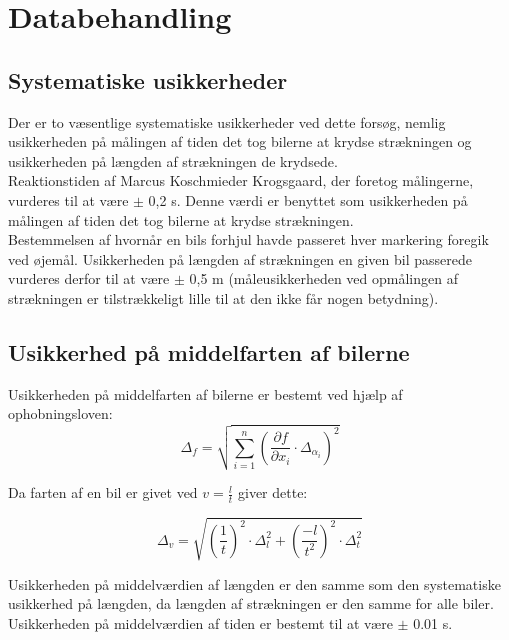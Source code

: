 \documentclass[hidelinks]{article}
\begin{document}
\newpage

\section{Databehandling}

\subsection{Systematiske usikkerheder}

Der er to væsentlige systematiske usikkerheder ved dette forsøg, nemlig usikkerheden på målingen af tiden det tog bilerne at krydse strækningen og usikkerheden på længden af strækningen de krydsede.\\

Reaktionstiden af Marcus Koschmieder Krogsgaard, der foretog målingerne, vurderes til at være $\pm$ 0,2 s. Denne værdi er benyttet som usikkerheden på målingen af tiden det tog bilerne at krydse strækningen.\\

Bestemmelsen af hvornår en bils forhjul havde passeret hver markering foregik ved øjemål. Usikkerheden på længden af strækningen en given bil passerede vurderes derfor til at være $\pm$ 0,5 m (måleusikkerheden ved opmålingen af strækningen er tilstrækkeligt lille til at den ikke får nogen betydning).\\

\subsection{Usikkerhed på middelfarten af bilerne} \label{usikkerhedmiddelfart}

Usikkerheden på middelfarten af bilerne er bestemt ved hjælp af ophobningsloven:\\

\[\Delta_f = \sqrt{\sum_{i = 1}^{n} \left( \frac{\partial f}{\partial x_i} \cdot \Delta_{\alpha_i} \right)^2}\]

Da farten af en bil er givet ved $v = \frac{l}{t}$ giver dette:

\[\Delta_v = \sqrt{\left(\frac{1}{t}\right)^2 \cdot \Delta^2_l + \left(\frac{-l}{t^2}\right)^2 \cdot \Delta^2_t}\]

Usikkerheden på middelværdien af længden er den samme som den systematiske usikkerhed på længden, da længden af strækningen er den samme for alle biler. Usikkerheden på middelværdien af tiden er bestemt til at være $\pm$ 0.01 s.\\
\end{document}
